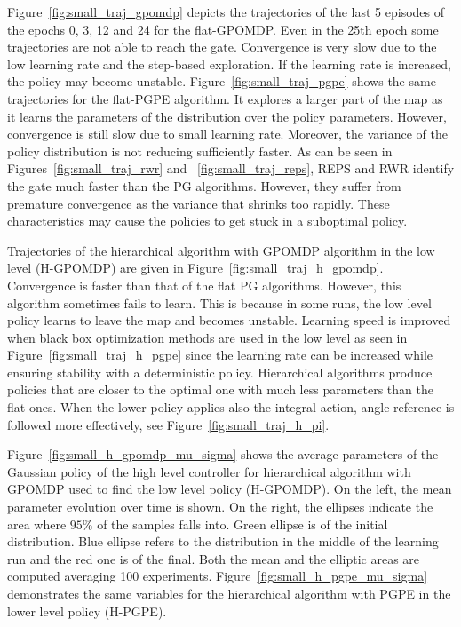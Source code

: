 Figure~\ref{fig:small_traj_gpomdp} depicts the trajectories of the last 5 episodes of the epochs 0, 3, 12 and 24 for the flat-GPOMDP. Even in the 25th epoch some trajectories are not able to reach the gate. Convergence is very slow due to the low learning rate and the step-based exploration. If the learning rate is increased, the policy may become unstable. Figure~\ref{fig:small_traj_pgpe} shows the same trajectories for the flat-PGPE algorithm. It explores a larger part of the map as it learns the parameters of the distribution over the policy parameters. However, convergence is still slow due to small learning rate. Moreover, the variance of the policy distribution is not reducing sufficiently faster.
As can be seen in Figures~\ref{fig:small_traj_rwr} and ~\ref{fig:small_traj_reps}, REPS and RWR identify the gate much faster than the PG algorithms. However, they suffer from premature convergence as the variance that shrinks too rapidly. These characteristics may cause the policies to get stuck in a suboptimal policy.

Trajectories of the hierarchical algorithm with GPOMDP algorithm in the low level (H-GPOMDP) are given in Figure~\ref{fig:small_traj_h_gpomdp}. Convergence is faster than that of the flat PG algorithms. However, this algorithm sometimes fails to learn. This is because in some runs, the low level policy learns to leave the map and becomes unstable.
Learning speed is improved when black box optimization methods are used in the low level as seen in Figure~\ref{fig:small_traj_h_pgpe} since the learning rate can be increased while ensuring stability with a deterministic policy. Hierarchical algorithms produce policies that are closer to the optimal one with much less parameters than the flat ones. When the lower policy applies also the integral action, angle reference is followed more effectively, see Figure~\ref{fig:small_traj_h_pi}.

\clearpage
{}

Figure~\ref{fig:small_h_gpomdp_mu_sigma} shows the average parameters of the Gaussian policy of the high level controller for hierarchical algorithm with GPOMDP used to find the low level policy (H-GPOMDP). On the left, the mean parameter evolution over time is shown. On the right, the ellipses indicate the area where $95\%$ of the samples falls into. Green ellipse is of the initial distribution. Blue ellipse refers to the distribution in the middle of the learning run and the red one is of the final. Both the mean and the elliptic areas are computed averaging 100 experiments. Figure~\ref{fig:small_h_pgpe_mu_sigma} demonstrates the same variables for the hierarchical algorithm with PGPE in the lower level policy (H-PGPE). 

